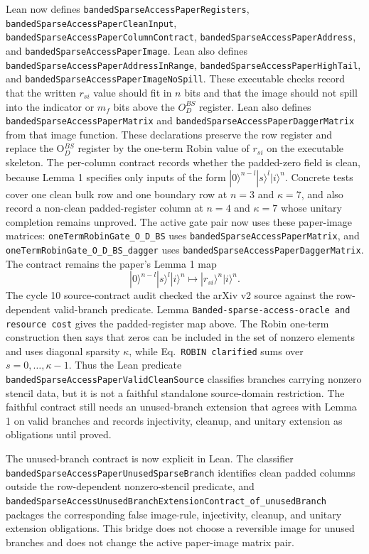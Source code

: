 Lean now defines \texttt{bandedSparseAccessPaperRegisters},
\texttt{bandedSparseAccessPaperCleanInput},
\texttt{bandedSparseAccessPaperColumnContract},
\texttt{bandedSparseAccessPaperAddress}, and
\texttt{bandedSparseAccessPaperImage}.  Lean also defines
\texttt{bandedSparseAccessPaperAddressInRange},
\texttt{bandedSparseAccessPaperHighTail}, and
\texttt{bandedSparseAccessPaperImageNoSpill}.  These executable checks record
that the written $r_{si}$ value should fit in $n$ bits and that the image should
not spill into the indicator or $m_f$ bits above the $O_D^{BS}$ register.  Lean
also defines
\texttt{bandedSparseAccessPaperMatrix} and
\texttt{bandedSparseAccessPaperDaggerMatrix} from that image function.  These
declarations preserve the row register and replace the O$_D^{BS}$ register by
the one-term Robin value of $r_{si}$ on the executable skeleton.  The
per-column contract records whether the padded-zero field is clean, because
Lemma 1 specifies only inputs of the form
$|0\rangle^{n-l}|s\rangle^l|i\rangle^n$.  Concrete tests cover one clean bulk
row and one boundary row at $n=3$ and $\kappa=7$, and also record a non-clean
padded-register column at $n=4$ and $\kappa=7$ whose unitary completion remains
unproved.  The active gate pair now uses these paper-image matrices:
\texttt{oneTermRobinGate\_O\_D\_BS} uses
\texttt{bandedSparseAccessPaperMatrix}, and
\texttt{oneTermRobinGate\_O\_D\_BS\_dagger} uses
\texttt{bandedSparseAccessPaperDaggerMatrix}.  The contract remains the
paper's Lemma 1 map
\[
  |0\rangle^{n-l}|s\rangle^l|i\rangle^n
  \longmapsto
  |r_{si}\rangle^n|i\rangle^n.
\]
The cycle 10 source-contract audit checked the arXiv v2 source against the
row-dependent valid-branch predicate.  Lemma
\texttt{Banded-sparse-access-oracle and resource cost} gives the padded-register
map above.  The Robin one-term construction then says that zeros can be
included in the set of nonzero elements and uses diagonal sparsity
\(\kappa\), while Eq.~\texttt{ROBIN clarified} sums over
\(s=0,\ldots,\kappa-1\).  Thus the Lean predicate
\texttt{bandedSparseAccessPaperValidCleanSource} classifies branches carrying
nonzero stencil data, but it is not a faithful standalone source-domain
restriction.  The faithful contract still needs an unused-branch extension that
agrees with Lemma 1 on valid branches and records injectivity, cleanup, and
unitary extension as obligations until proved.

The unused-branch contract is now explicit in Lean.  The classifier
\texttt{bandedSparseAccessPaperUnusedSparseBranch} identifies clean padded
columns outside the row-dependent nonzero-stencil predicate, and
\texttt{bandedSparseAccessUnusedBranchExtensionContract\_of\_unusedBranch}
packages the corresponding false image-rule, injectivity, cleanup, and unitary
extension obligations.  This bridge does not choose a reversible image for
unused branches and does not change the active paper-image matrix pair.

